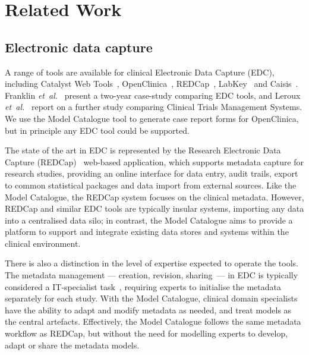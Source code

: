 
\section{Related Work}

\subsection{Electronic data capture}

A range of tools are available for clinical Electronic Data Capture
(EDC), including Catalyst Web Tools~\cite{catalyst},
OpenClinica~\cite{oc}, REDCap~\cite{harr09}, LabKey~\cite{labk} and
Caisis~\cite{cais}. Franklin \textit{et~al.}~\cite{fran11} present
a two-year case-study comparing EDC tools, 
and Leroux \textit{et~al.}~\cite{lero11} report on
a further study comparing Clinical Trials Management Systems. 
We use the Model Catalogue tool to generate
case report forms for OpenClinica, but in principle any EDC tool could be
supported. 

The state of the art in EDC is represented by the Research Electronic Data
Capture (REDCap)~\cite{harr09} web-based application, which
supports metadata capture for research studies, providing an online
interface for data entry, audit trails, export to common statistical
packages and data import from external sources. Like the Model
Catalogue, the REDCap system focuses on the clinical
metadata. However, REDCap and similar EDC tools are typically 
insular systems, importing any data into a centralised data silo;
in contrast, the Model
Catalogue aims to provide a platform to support and integrate 
existing data stores
and systems within the clinical environment.

There is also a distinction in the level of expertise expected to operate
the tools. The metadata management --- creation, revision, sharing~--- in
EDC is typically considered a IT-specialist task~\cite{harr09,fran11}, requiring
experts to initialise the metadata separately for each study. With the Model
Catalogue, clinical domain specialists have the ability to adapt and modify
metadata as needed, and treat models as the central
artefacts. Effectively, the Model Catalogue follows the same metadata
workflow as REDCap, but without the need for modelling experts to
develop, adapt or share the metadata models. 


